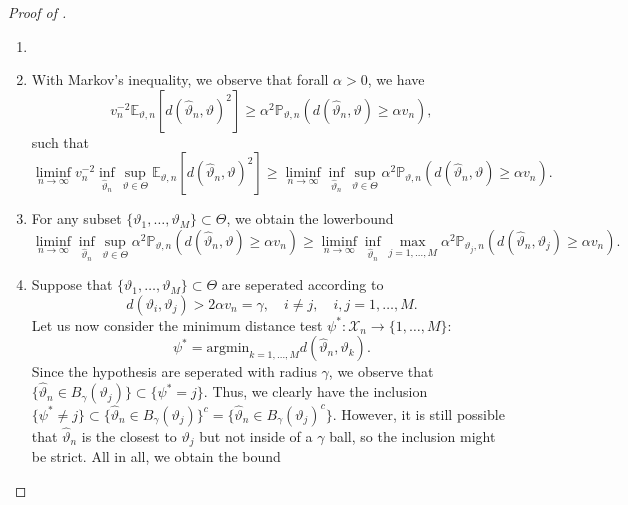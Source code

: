 \documentclass[a4paper]{article}
\begin{document}
\begin{proof}[Proof of ]
	\begin{enumerate}
		\item[]
		\item With Markov's inequality, we observe that forall $\alpha>0$, we have
		      \begin{equation*}
			      v_{n}^{-2}\mathbb{E}_{\vartheta,n}[d(\hat{\vartheta}_n, \vartheta)^{2}] \geq \alpha^{2}\mathbb{P}_{\vartheta,n}(d(\hat{\vartheta}_n, \vartheta) \geq \alpha v_n),
		      \end{equation*}
		      such that
		      \begin{equation*}
			      \liminf_{n \rightarrow \infty} v_n^{-2} \inf_{\hat{\vartheta}_n} \sup_{\vartheta \in \Theta} \mathbb{E}_{\vartheta,n}[d(\hat{\vartheta}_{n}, \vartheta)^{2}] \geq \liminf_{n \rightarrow \infty} \inf_{\hat{\vartheta}_n} \sup_{\vartheta \in \Theta} \alpha^{2}\mathbb{P}_{\vartheta,n}(d(\hat{\vartheta}_n, \vartheta) \geq \alpha v_n).
		      \end{equation*}
		\item For any subset $\{\vartheta_1, \dots, \vartheta_M\} \subset \Theta$, we obtain the lowerbound
		      \begin{equation*}
			      \liminf_{n \rightarrow \infty} \inf_{\hat{\vartheta}_n} \sup_{\vartheta \in \Theta} \alpha^{2}\mathbb{P}_{\vartheta,n}(d(\hat{\vartheta}_n, \vartheta) \geq \alpha v_n) \geq \liminf_{n \rightarrow \infty} \inf_{\hat{\vartheta}_n} \max_{j=1,\dots,M} \alpha^{2}\mathbb{P}_{\vartheta_j,n}(d(\hat{\vartheta}_n, \vartheta_j) \geq \alpha v_n).
		      \end{equation*}
		\item Suppose that $\{\vartheta_1, \dots, \vartheta_M\} \subset \Theta$ are seperated according to
		      \begin{equation}
			      \label{eq:seperation_condition}
			      d(\vartheta_i, \vartheta_j)> 2 \alpha v_n = \gamma, \quad i \neq j, \quad i,j=1, \dots, M.
		      \end{equation}
		      Let us now consider the minimum distance test $\psi^{*}:\mathcal{X}_n \rightarrow \{1, \dots,M\}$:
		      \begin{equation*}
			      \psi^{*}=\mathrm{argmin}_{k=1, \dots, M} d(\hat{\vartheta}_n, \vartheta_k).
		      \end{equation*}
		      Since the hypothesis are seperated with radius $\gamma$, we observe that $\{\hat{\vartheta}_n \in B_{\gamma}(\vartheta_j)\} \subset\{\psi^{*} = j\}$. Thus, we clearly have the inclusion $\{\psi^{*} \neq j\}  \subset \{ \hat{\vartheta}_n  \in B_{\gamma}(\vartheta_j)\}^{c}=\{\hat{\vartheta}_n \in B_{\gamma}(\vartheta_j)^{c}\}$. However, it is still possible that $\hat{\vartheta}_n$ is the closest to $\vartheta_j$ but not inside of a $\gamma$ ball, so the inclusion might be strict. All in all, we obtain the bound

\end{enumerate}
\end{proof}
\end{document}
